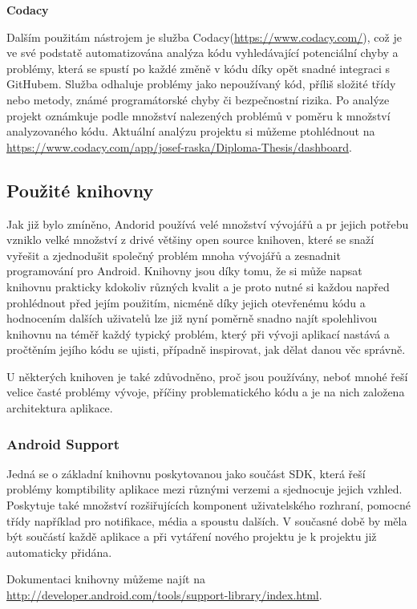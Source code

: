 \documentclass{article}
\begin{document}
\noindent
\textbf{Codacy}


Dalším použitám nástrojem je služba Codacy(\url{https://www.codacy.com/}), což je ve své podstatě
automatizována analýza kódu vyhledávající potenciální chyby a problémy, která se spustí po každé změně v kódu
díky opět snadné integraci s GitHubem. Služba odhaluje problémy jako nepoužívaný kód, příliš složité
třídy nebo metody, známé programátorské chyby či bezpečnostní rizika. Po analýze projekt oznámkuje podle
množství nalezených problémů v poměru k množství analyzovaného kódu. Aktuální analýzu projektu si můžeme ptohlédnout
na \url{https://www.codacy.com/app/josef-raska/Diploma-Thesis/dashboard}.

\subsection{Použité knihovny}
Jak již bylo zmíněno, Andorid používá velé množství vývojářů a pr jejich potřebu vzniklo velké množství
z drivé většiny open source knihoven, které se snaží vyřešit a zjednodušit společný problém mnoha vývojářů
a zesnadnit programování pro Android. Knihovny jsou díky tomu, že si může napsat knihovnu prakticky kdokoliv
různých kvalit a je proto nutné si každou napřed prohlédnout před jejím použitím, nicméně díky jejich
otevřenému kódu a hodnocením dalších uživatelů lze již nyní poměrně snadno najít spolehlivou knihovnu na téměř každý
typický problém, který při vývoji aplikací nastává a pročtěním jejího kódu se ujisti, případně inspirovat,
jak dělat danou věc správně.

U některých knihoven je také zdůvodněno, proč jsou používány,
neboť mnohé řeší velice časté problémy vývoje, příčiny problematického kódu a je na nich založena
architektura aplikace.

\subsubsection{Android Support}
Jedná se o základní knihovnu poskytovanou jako součást SDK, která řeší problémy komptibility aplikace
mezi různými verzemi a sjednocuje jejich vzhled. Poskytuje také množství rozšiřujících komponent uživatelského rozhraní,
pomocné třídy například pro notifikace, média a spoustu dalších. V současné době by měla být součástí každě
aplikace a při vytáření nového projektu je k projektu již automaticky přidána.

Dokumentaci knihovny můžeme najít na \url{http://developer.android.com/tools/support-library/index.html}.
\end{document}
